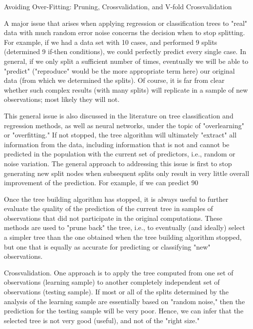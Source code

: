 Avoiding Over-Fitting: Pruning, Crossvalidation, and V-fold Crossvalidation

A major issue that arises when applying regression or classification trees to "real" data with much random error noise concerns the decision when to stop splitting. For example, if we had a data set with 10 cases, and performed 9 splits (determined 9 if-then conditions), we could perfectly predict every single case. In general, if we only split a sufficient number of times, eventually we will be able to "predict" ("reproduce" would be the more appropriate term here) our original data (from which we determined the splits). Of course, it is far from clear whether such complex results (with many splits) will replicate in a sample of new observations; most likely they will not.

This general issue is also discussed in the literature on tree classification and regression methods, as well as neural networks, under the topic of "overlearning" or "overfitting." If not stopped, the tree algorithm will ultimately "extract" all information from the data, including information that is not and cannot be predicted in the population with the current set of predictors, i.e., random or noise variation. The general approach to addressing this issue is first to stop generating new split nodes when subsequent splits only result in very little overall improvement of the prediction. For example, if we can predict 90%

Once the tree building algorithm has stopped, it is always useful to further evaluate the quality of the prediction of the current tree in samples of observations that did not participate in the original computations. These methods are used to "prune back" the tree, i.e., to eventually (and ideally) select a simpler tree than the one obtained when the tree building algorithm stopped, but one that is equally as accurate for predicting or classifying "new" observations.

Crossvalidation. One approach is to apply the tree computed from one set of observations (learning sample) to another completely independent set of observations (testing sample). If most or all of the splits determined by the analysis of the learning sample are essentially based on "random noise," then the prediction for the testing sample will be very poor. Hence, we can infer that the selected tree is not very good (useful), and not of the "right size."


